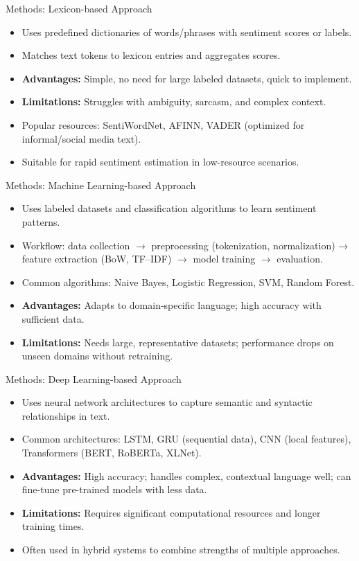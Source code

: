 \documentclass[aspectratio=169, table]{beamer}
\begin{document}
\begin{frame}{Methods: Lexicon-based Approach}
	\vspace{20pt}
	\begin{itemize}
		\item Uses predefined dictionaries of words/phrases with sentiment scores or labels.
		\item Matches text tokens to lexicon entries and aggregates scores.
		\item \textbf{Advantages:} Simple, no need for large labeled datasets, quick to implement.
		\item \textbf{Limitations:} Struggles with ambiguity, sarcasm, and complex context.
		\item Popular resources: SentiWordNet, AFINN, VADER (optimized for informal/social media text).
		\item Suitable for rapid sentiment estimation in low-resource scenarios.
	\end{itemize}
\end{frame}

\begin{frame}{Methods: Machine Learning-based Approach}
	\vspace{20pt}
	\begin{itemize}
		\item Uses labeled datasets and classification algorithms to learn sentiment patterns.
		\item Workflow: data collection $\rightarrow$ preprocessing (tokenization, normalization) → feature extraction (BoW, TF–IDF) $\rightarrow$ model training $\rightarrow$ evaluation.
		\item Common algorithms: Naive Bayes, Logistic Regression, SVM, Random Forest.
		\item \textbf{Advantages:} Adapts to domain-specific language; high accuracy with sufficient data.
		\item \textbf{Limitations:} Needs large, representative datasets; performance drops on unseen domains without retraining.
	\end{itemize}
\end{frame}

\begin{frame}{Methods: Deep Learning-based Approach}
	\vspace{20pt}
	\begin{itemize}
		\item Uses neural network architectures to capture semantic and syntactic relationships in text.
		\item Common architectures: LSTM, GRU (sequential data), CNN (local features), Transformers (BERT, RoBERTa, XLNet).
		\item \textbf{Advantages:} High accuracy; handles complex, contextual language well; can fine-tune pre-trained models with less data.
		\item \textbf{Limitations:} Requires significant computational resources and longer training times.
		\item Often used in hybrid systems to combine strengths of multiple approaches.
	\end{itemize}
\end{frame}
\end{document}
